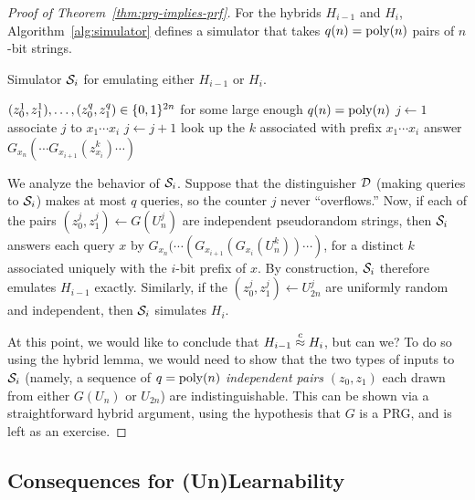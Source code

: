 \documentclass[11pt]{article}
\begin{document}
\begin{proof}[Proof of Theorem~\ref{thm:prg-implies-prf}]
  For the hybrids $H_{i-1}$ and $H_{i}$, Algorithm~\ref{alg:simulator}
  defines a simulator that takes $q(n) = \operatorname{poly}(n)$ pairs of $n$-bit
  strings.
  
  \renewcommand{\algorithmicrequire}{\textbf{Input:}}

  \begin{algorithm}
    \label{alg:simulator}
    \caption{Simulator $\mathcal{S}_{i}$ for emulating either $H_{i-1}$ or $H_{i}$.}
    \begin{algorithmic}[1]
      \REQUIRE $(z^1_0, z^1_1), \ldots , (z^q_0, z^q_1) \in \{0,1\}^{2n}$
      for some large enough $q(n) = \operatorname{poly}(n)$
      \STATE $j \gets 1$
      \STATE associate $j$ to $x_{1} \cdots x_{i}$
      \STATE $j \gets j+1$
      \ENDIF
      \STATE look up the $k$ associated with prefix $x_{1} \cdots
      x_{i}$
      \STATE answer $G_{x_{n}}(\cdots G_{x_{i+1}}(z^{k}_{x_{i}})
      \cdots)$
      \ENDWHILE
    \end{algorithmic}
  \end{algorithm}

  We analyze the behavior of $\mathcal{S}_{i}$.  Suppose that the
  distinguisher $\mathcal{D}$ (making queries to $\mathcal{S}_{i}$) makes at most
  $q$ queries, so the counter $j$ never ``overflows.''  Now, if each
  of the pairs $(z^{j}_{0}, z^{j}_{1}) \gets G(U^{j}_{n})$ are
  independent pseudorandom strings, then $\mathcal{S}_{i}$ answers each query
  $x$ by $G_{x_{n}}(\cdots (G_{x_{i+1}}(G_{x_{i}}(U^{k}_{n}))\cdots)$,
  for a distinct $k$ associated uniquely with the $i$-bit prefix of
  $x$.  By construction, $\mathcal{S}_{i}$ therefore emulates $H_{i-1}$
  exactly.  Similarly, if the $(z^{j}_{0}, z^{j}_{1}) \gets U^j_{2n}$
  are uniformly random and independent, then $\mathcal{S}_{i}$ simulates
  $H_{i}$.

  At this point, we would like to conclude that $H_{i-1} \stackrel{c}{\approx}
  H_{i}$, but can we?  To do so using the hybrid lemma, we would need
  to show that the two types of inputs to $\mathcal{S}_{i}$ (namely, a
  sequence of $q = \operatorname{poly}(n)$ \emph{independent pairs} $(z_{0}, z_{1})$
  each drawn from either $G(U_{n})$ or $U_{2n}$) are
  indistinguishable.  This can be shown via a straightforward hybrid
  argument, using the hypothesis that $G$ is a PRG, and is left as an
  exercise.
\end{proof}

\subsection{Consequences for (Un)Learnability}
\label{sec:cons-learning}
\end{document}
